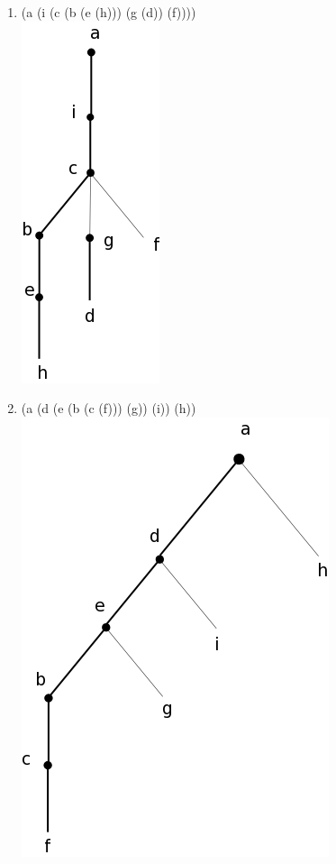 \documentclass[a4paper, 11pt]{article}
\begin{document}
\begin{enumerate}
    \item (a (i (c (b (e (h))) (g (d)) (f))))\\\includegraphics[scale=0.3]{reponse3.png}
    \item (a (d (e (b (c (f))) (g)) (i)) (h))\\\includegraphics[scale=0.3]{reponse4.png}

\end{enumerate}
\end{document}
